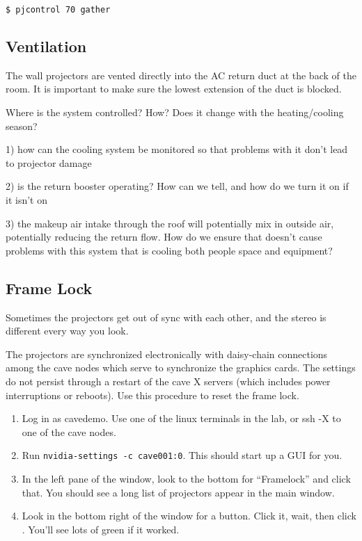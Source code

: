 \documentclass[11pt]{article}
\newcommand{\cmd}[1]{\texttt{#1}\xspace}
\newcommand{\menu}[1]{``#1''\xspace}
\newcommand{\button}[1]{\framebox{\textsf{#1}\xspace}}
\begin{document}
\begin{verbatim}
$ pjcontrol 70 gather
\end{verbatim}




\subsection{Ventilation}

The wall projectors are vented directly into the AC return duct at the
back of the room.  It is important to make sure the lowest extension
of the duct is blocked.

Where is the system controlled?  How?  Does it change with the
heating/cooling season?

1) how can the cooling system be monitored so that problems with it
don’t lead to projector damage

2) is the return booster operating?  How can we tell, and how do we
turn it on if it isn’t on

3) the makeup air intake through the roof will potentially mix in
outside air, potentially reducing the return flow.  How do we ensure
that doesn’t cause problems with this system that is cooling both
people space and equipment?


\subsection{Frame Lock}
\label{framelock}

Sometimes the projectors get out of sync with each other, and the
stereo is different every way you look.

The projectors are synchronized electronically with daisy-chain
connections among the cave nodes which serve to synchronize the
graphics cards.  The settings do not persist through a restart of the
cave X servers (which includes power interruptions or reboots).  Use
this procedure to reset the frame lock.

\begin{enumerate}

\item Log in as cavedemo.  Use one of the linux terminals in the lab,
  or ssh -X to one of the cave nodes.

\item Run \cmd{nvidia-settings -c cave001:0}.  This should start up
  a GUI for you.

\item In the left pane of the window, look to the bottom for
  \menu{Framelock} and click that.  You should see a long list of
  projectors appear in the main window.

\item Look in the bottom right of the window for a \button{Disable frame
  lock} button.  Click it, wait, then click \button{Enable frame lock}.
  You'll see lots of green if it worked.

\end{enumerate}
\end{document}

